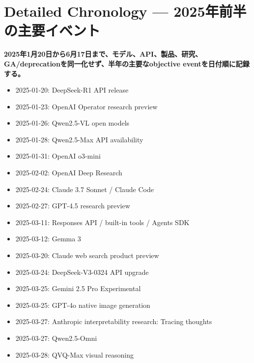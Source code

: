 \section{Detailed Chronology — 2025年前半の主要イベント}
\label{pkg:chronology}
\noindent\textbf{2025年1月20日から6月17日まで、モデル、API、製品、研究、GA/deprecationを同一化せず、半年の主要なobjective eventを日付順に記録する。}\autocite{src-53f15d483a2d,src-8f8555b73e1b}

\begin{itemize}
  \item 2025-01-20: DeepSeek-R1 API release
  \item 2025-01-23: OpenAI Operator research preview
  \item 2025-01-26: Qwen2.5-VL open models
  \item 2025-01-28: Qwen2.5-Max API availability
  \item 2025-01-31: OpenAI o3-mini
\end{itemize}
\autocite{src-650b567698aa,src-8c485019ad8d,src-8f8555b73e1b,src-95b210494c88,src-dc21f366b638}

\begin{itemize}
  \item 2025-02-02: OpenAI Deep Research
  \item 2025-02-24: Claude 3.7 Sonnet / Claude Code
  \item 2025-02-27: GPT-4.5 research preview
\end{itemize}
\autocite{src-3fa7f4cd510b,src-8fec3ef3a97d,src-a6c92f94a0af}

\begin{itemize}
  \item 2025-03-11: Responses API / built-in tools / Agents SDK
  \item 2025-03-12: Gemma 3
  \item 2025-03-20: Claude web search product preview
  \item 2025-03-24: DeepSeek-V3-0324 API upgrade
  \item 2025-03-25: Gemini 2.5 Pro Experimental
  \item 2025-03-25: GPT-4o native image generation
  \item 2025-03-27: Anthropic interpretability research: Tracing thoughts
  \item 2025-03-27: Qwen2.5-Omni
  \item 2025-03-28: QVQ-Max visual reasoning
\end{itemize}
\autocite{src-1bb16d7254b1,src-421ee9af3f80,src-6e15bd50b7db,src-78593f4b387f,src-877e7da88408,src-8cb736b33646,src-8f8555b73e1b,src-de4ffd746276,src-fdc10e3226e6}

